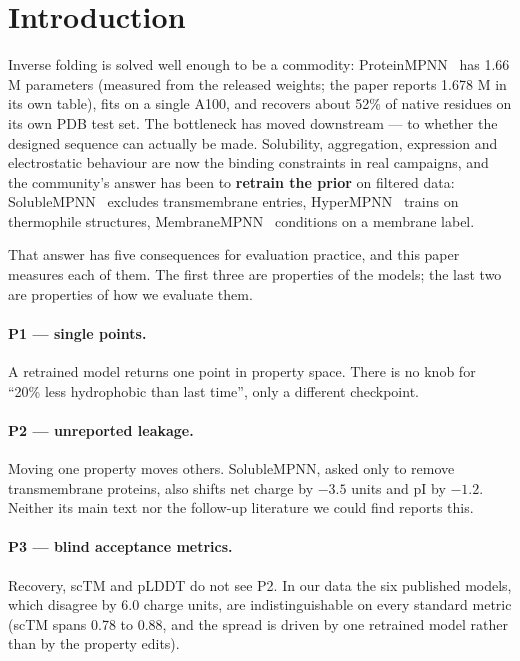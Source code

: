 \section{Introduction}
\label{sec:intro}

Inverse folding is solved well enough to be a commodity: ProteinMPNN~\cite{proteinmpnn}
has 1.66 M parameters (measured from the released weights; the paper reports
1.678 M in its own table), fits on a single A100, and recovers about 52\% of
native residues on its own PDB test set. The bottleneck has moved downstream ---
to whether the designed sequence can actually be made. Solubility, aggregation,
expression and electrostatic behaviour are now the binding constraints in real
campaigns, and the community's answer has been to \textbf{retrain the prior} on
filtered data: SolubleMPNN~\cite{soluble_mpnn} excludes transmembrane entries,
HyperMPNN~\cite{hypermpnn} trains on thermophile structures,
MembraneMPNN~\cite{membranempnn} conditions on a membrane label.

That answer has five consequences for evaluation practice, and this paper
measures each of them. The first three are properties of the models; the last
two are properties of how we evaluate them.

\paragraph{P1 --- single points.}
A retrained model returns one point in property space. There is no knob for
``20\% less hydrophobic than last time'', only a different checkpoint.

\paragraph{P2 --- unreported leakage.}
Moving one property moves others. SolubleMPNN, asked only to remove
transmembrane proteins, also shifts net charge by $-3.5$ units and pI by
$-1.2$. Neither its main text nor the follow-up literature we could find reports
this.

\paragraph{P3 --- blind acceptance metrics.}
Recovery, scTM and pLDDT do not see P2. In our data the six published models,
which disagree by 6.0 charge units, are indistinguishable on every standard
metric (scTM spans 0.78 to 0.88, and the spread is driven by one retrained model
rather than by the property edits).

